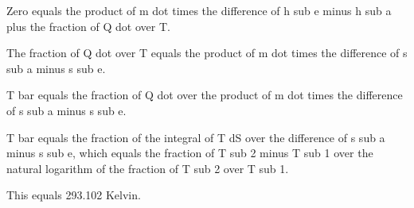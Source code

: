 Zero equals the product of m dot times the difference of h sub e minus h sub a plus the fraction of Q dot over T.

The fraction of Q dot over T equals the product of m dot times the difference of s sub a minus s sub e.

T bar equals the fraction of Q dot over the product of m dot times the difference of s sub a minus s sub e.

T bar equals the fraction of the integral of T dS over the difference of s sub a minus s sub e, which equals the fraction of T sub 2 minus T sub 1 over the natural logarithm of the fraction of T sub 2 over T sub 1.

This equals 293.102 Kelvin.